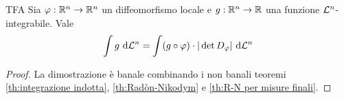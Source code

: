 \documentclass{article}
\begin{document}
\begin{theorem}{TFA}{}
    Sia $\varphi : \mathbb{R}^n \to \mathbb{R}^n$ un diffeomorfismo locale e $g : \mathbb{R}^n \to \mathbb{R}$ una funzione $\mathcal{L}^n$-integrabile. Vale
    \[\int\limits g \text{ d} \mathcal{L}^n = \int (g \circ \varphi)\cdot |\det D_\varphi|\text{ d} \mathcal{L}^n\]
    \begin{proof}
        La dimostrazione è banale combinando i non banali teoremi \ref{th:integrazione indotta}, \ref{th:Radòn-Nikodym} e \ref{th:R-N per misure finali}.
    \end{proof}
\end{theorem}

\printbibliography
\end{document}
